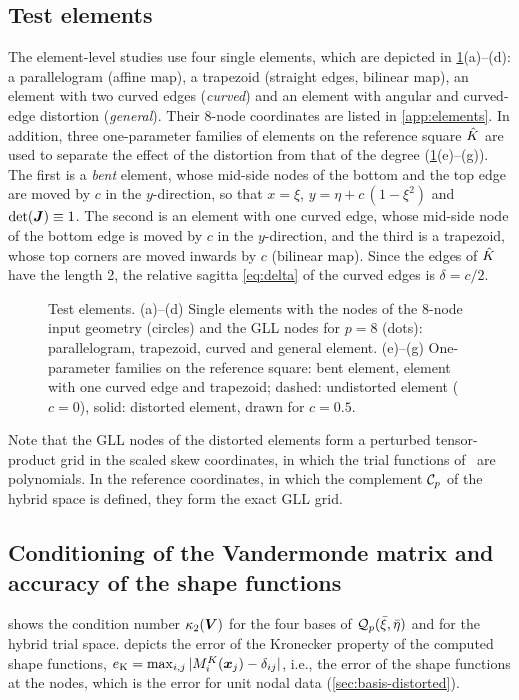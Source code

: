 \subsection{Test elements}
\label{sec:num-elements}
%
The element-level studies use four single elements, which are depicted in \cref{fig:elements}(a)--(d): a parallelogram (affine map), a trapezoid (straight edges, bilinear map), an element with two curved edges (\emph{curved}) and an element with angular and curved-edge distortion (\emph{general}). Their 8-node coordinates are listed in \cref{app:elements}. In addition, three one-parameter families of elements on the reference square $\hat K$ are used to separate the effect of the distortion from that of the degree (\cref{fig:elements}(e)--(g)). The first is a \emph{bent} element, whose mid-side nodes of the bottom and the top edge are moved by $c$ in the $y$-direction, so that $x=\xi$, $y=\eta+c\,(1-\xi^2)$ and $\det(\bm{J})\equiv1$. The second is an element with one curved edge, whose mid-side node of the bottom edge is moved by $c$ in the $y$-direction, and the third is a trapezoid, whose top corners are moved inwards by $c$ (bilinear map). Since the edges of $\hat K$ have the length 2, the relative sagitta \cref{eq:delta} of the curved edges is $\delta=c/2$.

\begin{figure}[htbp]
  \centering
  
  \caption{Test elements. (a)--(d) Single elements with the nodes of the 8-node input geometry (circles) and the GLL nodes for $p=8$ (dots): parallelogram, trapezoid, curved and general element. (e)--(g) One-parameter families on the reference square: bent element, element with one curved edge and trapezoid; dashed: undistorted element ($c=0$), solid: distorted element, drawn for $c=0.5$.}
  \label{fig:elements}
\end{figure}

Note that the GLL nodes of the distorted elements form a perturbed tensor-product grid in the scaled skew coordinates, in which the trial functions of \PM\ are polynomials. In the reference coordinates, in which the complement $\mathcal C_p$ of the hybrid space is defined, they form the exact GLL grid.
%
\subsection{Conditioning of the Vandermonde matrix and accuracy of the shape functions}
\label{sec:num-conditioning}
%
 shows the condition number $\kappa_2(\bm{V})$ for the four bases of $\mathcal Q_p(\bar\xi,\bar\eta)$ and for the hybrid trial space.  depicts the error of the Kronecker property of the computed shape functions, $e_{\mathrm{K}}=\max_{i,j}|M_i^K(\bm{x}_j)-\delta_{ij}|$, i.e., the error of the shape functions at the nodes, which is the error for unit nodal data (\cref{sec:basis-distorted}).


